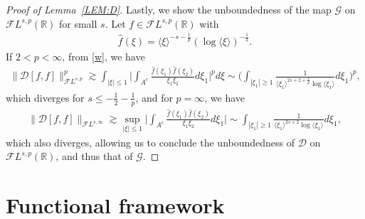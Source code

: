 \documentclass[%
11pt,  reqno]{amsart}
\makeatletter
\newcommand{\jap}[1]{\langle #1 \rangle}
\newcommand{\5}{\textup{V}}
\newcommand{\FL}{\mathcal{F} L}
\newcommand{\ft}{\widehat}
\newcommand{\les}{\lesssim}
\theoremstyle{remark}
\newcommand{\R}{\mathbb{R}}
\newcommand{\ges}{\gtrsim}
\newcommand{\jb}[1]
{\langle #1 \rangle}
\def\<#1>{\csname MH@symb@#1\endcsname}
\newcommand{\cherryS}{
	\resizebox{!}{1.3ex}{%
		\<1>%
	}
}
\newcommand{\Gc}{\mathcal{G}}
\numberwithin{equation}{section}
\numberwithin{theorem}{section}
\newcommand{\DD}{\mathcal{D}}
\makeatother
\begin{document}
\begin{proof}[Proof of Lemma~\ref{LEM:D}]


\smallskip 

Lastly, we show the unboundedness of the map $\Gc$ on $\FL^{s,p}(\R)$ for small $s$. Let $f \in \FL^{s, p}(\R)$ with 
\begin{align}
    \ft{f}(\xi) = \jb{\xi}^{-s-\frac1p}(\log \jap{\xi})^{-\frac12}. 
\end{align}
If $2 <p <\infty$, from \eqref{w}, we have
\begin{align}
\| \DD[f,f] \|_{\FL^{s,p}}^p 
\ges 
\int_{|\xi|\le 1} \bigg| \int_{A^c} \frac{\ft{f}(\xi_1) \ft{f}(\xi_2) }{\xi_1\xi_2} d\xi_1 \bigg|^p d\xi
\sim \bigg( \int_{|\xi_1| \ge 1} \frac{1}{\jb{\xi_1}^{2s+2 + \frac2p  }\log\jap{\xi_1}} d\xi_1\bigg)^p , 
\end{align}
which diverges for $s\le-\frac12 - \frac1p$, and for $p=\infty$, we have
\begin{align}
\| \DD[f,f]\|_{\FL^{s,\infty }}
\ges 
\sup_{|\xi| \le 1} 
\bigg| \int_{A^c} \frac{\ft{f}(\xi_1) \ft{f}(\xi_2) }{\xi_1\xi_2} d\xi_1 \bigg|
\sim 
\int_{|\xi_1| \ge 1 } \frac{1}{\jb{\xi_1}^{2s+2}\log\jap{\xi_1}} d\xi_1  ,
\end{align}
which also diverges, allowing us to conclude the unboundedness of $\DD$ on $\FL^{s, p}(\R)$, and thus that of $\Gc$. 
\qedhere 

\end{proof}






	\section{Functional framework}
	
\end{document}
